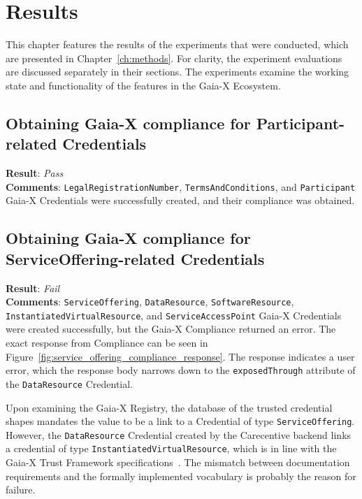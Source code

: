 \chapter{Results}\label{ch:results}

\begin{chapterabstract}
    This chapter features the results of the experiments that were conducted, which are presented in Chapter~\ref{ch:methods}.
    For clarity, the experiment evaluations are discussed separately in their sections.
    The experiments examine the working state and functionality of the features in the Gaia-X Ecosystem.
\end{chapterabstract}

\section[Participant Compliance]{Obtaining Gaia-X compliance for Participant-related Credentials}\label{sec:obtaining-gaia-x-compliance-for-participant-related-credentials}

\textbf{Result}: \textit{Pass}
\\
\textbf{Comments}: \texttt{LegalRegistrationNumber}, \texttt{TermsAndConditions}, and \texttt{Participant} Gaia-X Credentials were successfully created, and their compliance was obtained.

\section[Service Offering Compliance]{Obtaining Gaia-X compliance for ServiceOffering-related Credentials}\label{sec:obtaining-gaia-x-compliance-for-serviceoffering-related-credentials}

\textbf{Result}: \textit{Fail}
\\
\textbf{Comments}: \texttt{ServiceOffering}, \texttt{DataResource}, \texttt{SoftwareResource}, \texttt{InstantiatedVirtualResource}, and \texttt{ServiceAccessPoint} Gaia-X Credentials were created successfully, but the Gaia-X Compliance returned an error.
The exact response from Compliance can be seen in Figure~\ref{fig:service_offering_compliance_response}.
The response indicates a user error, which the response body narrows down to the \texttt{exposedThrough} attribute of the \texttt{DataResource} Credential.

Upon examining the Gaia-X Registry, the database of the trusted credential shapes mandates the value to be a link to a Credential of type \texttt{ServiceOffering}.
However, the \texttt{DataResource} Credential created by the Carecentive backend links a credential of type \texttt{InstantiatedVirtualResource}, which is in line with the Gaia-X Trust Framework specifications~\cite{gaiax_trust_framework}.
The mismatch between documentation requirements and the formally implemented vocabulary is probably the reason for failure.

